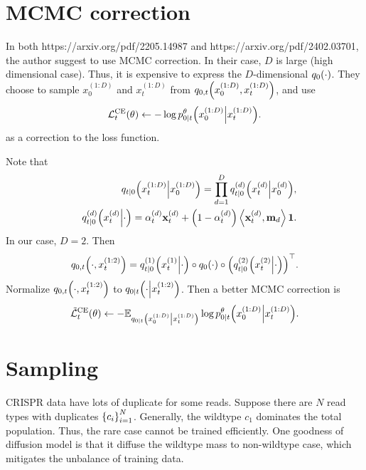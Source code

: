 \documentclass[10pt]{article}
\begin{document}
\section{MCMC correction}
In both https://arxiv.org/pdf/2205.14987 and https://arxiv.org/pdf/2402.03701, the author suggest to use MCMC correction. In their case, $D$ is large (high dimensional case). Thus, it is expensive to express the $D$-dimensional $q_0\qty(\cdot)$. They choose to sample $x^{(1:D)}_0$ and $x^{(1:D)}_t$ from $q_{0,t}\qty(x^{(1:D)}_0, x^{(1:D)}_t)$, and use
\begin{eqnarray*}
  \mathcal{L}^\text{CE}_t(\theta)\gets -\log p^\theta_{0|t}\qty(x^{(1:D)}_0\middle|x^{(1:D)}_t).
\end{eqnarray*}
as a correction to the loss function.

Note that
\begin{eqnarray*}
  &&q_{t|0}\qty(x^{(1:D)}_t\middle|x^{(1:D)}_0) = \prod_{d=1}^D q^{(d)}_{t|0}\qty(x^{(d)}_t\middle|x^{(d)}_0),\\
  &&q^{(d)}_{t|0}\qty(x^{(d)}_t\middle|\cdot) = \alpha^{(d)}_t \mathbf{x}^{(d)}_t + \qty(1 - \alpha^{(d)}_t)\left\langle\mathbf{x}^{(d)}_t, \mathbf{m}_d\right\rangle\mathbf{1}.
\end{eqnarray*}
In our case, $D = 2$. Then
\begin{eqnarray*}
  q_{0, t}\qty(\cdot, x^{(1:2)}_t) = q^{(1)}_{t|0}\qty(x^{(1)}_t\middle|\cdot) \circ q_0\qty(\cdot) \circ \qty(q^{(2)}_{t|0}\qty(x^{(2)}_t\middle|\cdot))^\top.
\end{eqnarray*}
Normalize $q_{0, t}\qty(\cdot, x^{(1:2)}_t)$ to $q_{0|t}\qty(\cdot\middle|x^{(1:2)}_t)$. Then a better MCMC correction is
\begin{eqnarray*}
  \tilde{\mathcal{L}}^\text{CE}_t(\theta)\gets -\mathbb{E}_{q_{0|t}\qty(x^{(1:D)}_0\middle|x^{(1:D)}_t)}\log p^\theta_{0|t}\qty(x^{(1:D)}_0\middle|x^{(1:D)}_t).
\end{eqnarray*}

\section{Sampling}
CRISPR data have lots of duplicate for some reads. Suppose there are $N$ read types with duplicates $\qty{c_i}_{i=1}^N$. Generally, the wildtype $c_1$ dominates the total population. Thus, the rare case cannot be trained efficiently. One goodness of diffusion model is that it diffuse the wildtype mass to non-wildtype case, which mitigates the unbalance of training data.
\end{document}
